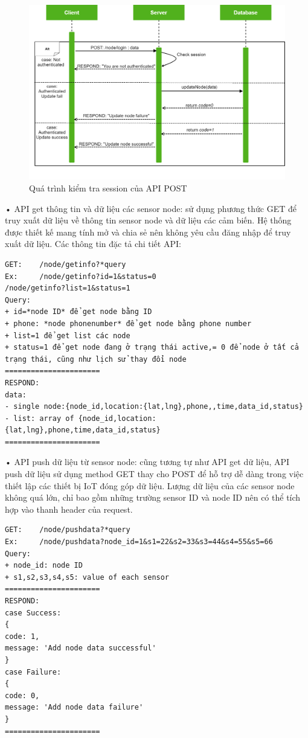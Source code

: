 \begin{figure}[H]
	\centering    
	\includegraphics[width=1\textwidth]{apipost}
	\caption[Quá trình kiểm tra session của API POST]{Quá trình kiểm tra session của API POST}
	\label{fig: apipost}
\end{figure}

• API get thông tin và dữ liệu các sensor node: sử dụng phương thức GET để truy xuất dữ liệu về thông tin sensor node và dữ liệu các cảm biến. Hệ thống được thiết kế mang tính mở và chia sẻ nên không yêu cầu đăng nhập để truy xuất dữ liệu. Các thông tin đặc tả chi tiết API:
\begin{Verbatim}[xleftmargin=2em]
GET:	/node/getinfo?*query
Ex: 	/node/getinfo?id=1&status=0
/node/getinfo?list=1&status=1
Query:
+ id=*node ID* để get node bằng ID
+ phone: *node phonenumber* để get node bằng phone number
+ list=1 để get list các node
+ status=1 để get node đang ở trạng thái active,= 0 để node ở tất cả 
trạng thái, cũng như lịch sử thay đổi node
======================
RESPOND:
data:
- single node:{node_id,location:{lat,lng},phone,,time,data_id,status}
- list: array of {node_id,location:{lat,lng},phone,time,data_id,status}
======================
\end{Verbatim}

• API push dữ liệu từ sensor node: cũng tương tự như API get dữ liệu, API push dữ liệu sử dụng method GET thay cho POST để hỗ trợ dễ dàng trong việc thiết lập các thiết bị IoT đóng góp dữ liệu. Lượng dữ liệu của các sensor node không quá lớn, chỉ bao gồm những trường sensor ID và node ID nên có thể tích hợp vào thanh header của request.

\begin{Verbatim}[xleftmargin=2em]
GET: 	/node/pushdata?*query
Ex: 	/node/pushdata?node_id=1&s1=22&s2=33&s3=44&s4=55&s5=66
Query:
+ node_id: node ID
+ s1,s2,s3,s4,s5: value of each sensor
======================
RESPOND:
case Success:
{
code: 1,
message: 'Add node data successful'
}
case Failure:	
{
code: 0,
message: 'Add node data failure'
}
======================
\end{Verbatim}

